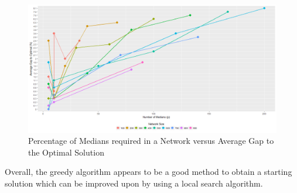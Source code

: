 \documentclass[11pt]{article}
\begin{document}
	\begin{figure}[H]
		\begin{center}
			\includegraphics[width=14cm]{medvsaccuracy_greedy.png}
			\caption{Percentage of Medians required in a Network versus Average Gap to the Optimal Solution}
			\label{medvsaccuracy_greedy}
		\end{center}
	\end{figure}
	
	Overall, the greedy algorithm appears to be a good method to obtain a starting solution which can be improved upon by using a local search algorithm.
	
\end{document}
